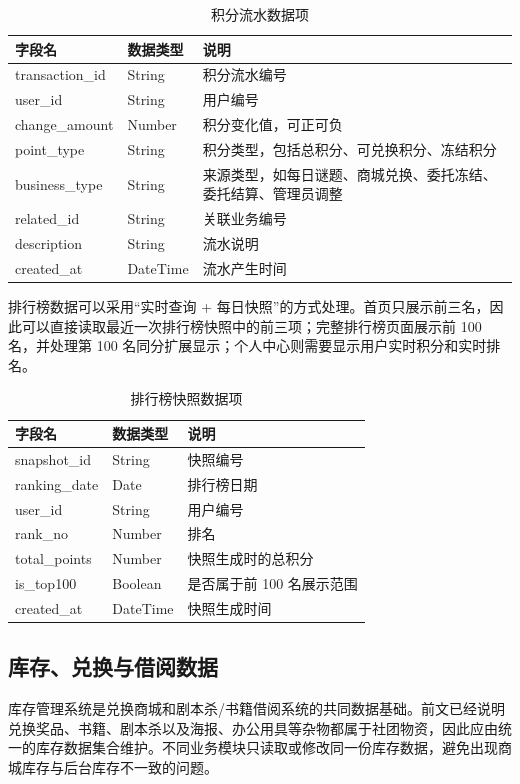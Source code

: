\documentclass[a4paper,12pt]{article}
\begin{document}
\begin{longtable}{p{3.5cm}p{3cm}p{7cm}}
\caption{积分流水数据项} \\
\toprule
字段名 & 数据类型 & 说明 \\
\midrule
transaction\_id & String & 积分流水编号 \\
user\_id & String & 用户编号 \\
change\_amount & Number & 积分变化值，可正可负 \\
point\_type & String & 积分类型，包括总积分、可兑换积分、冻结积分 \\
business\_type & String & 来源类型，如每日谜题、商城兑换、委托冻结、委托结算、管理员调整 \\
related\_id & String & 关联业务编号 \\
description & String & 流水说明 \\
created\_at & DateTime & 流水产生时间 \\
\bottomrule
\end{longtable}

排行榜数据可以采用“实时查询 + 每日快照”的方式处理。首页只展示前三名，因此可以直接读取最近一次排行榜快照中的前三项；完整排行榜页面展示前 100 名，并处理第 100 名同分扩展显示；个人中心则需要显示用户实时积分和实时排名。
\begin{longtable}{p{3.5cm}p{3cm}p{7cm}}
\caption{排行榜快照数据项} \\
\toprule
字段名 & 数据类型 & 说明 \\
\midrule
snapshot\_id & String & 快照编号 \\
ranking\_date & Date & 排行榜日期 \\
user\_id & String & 用户编号 \\
rank\_no & Number & 排名 \\
total\_points & Number & 快照生成时的总积分 \\
is\_top100 & Boolean & 是否属于前 100 名展示范围 \\
created\_at & DateTime & 快照生成时间 \\
\bottomrule
\end{longtable}
\subsection{库存、兑换与借阅数据}

库存管理系统是兑换商城和剧本杀/书籍借阅系统的共同数据基础。前文已经说明兑换奖品、书籍、剧本杀以及海报、办公用具等杂物都属于社团物资，因此应由统一的库存数据集合维护。不同业务模块只读取或修改同一份库存数据，避免出现商城库存与后台库存不一致的问题。
\end{document}
